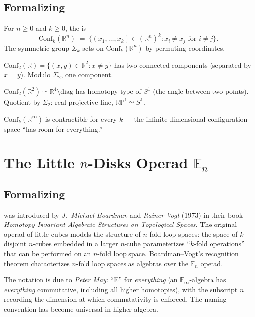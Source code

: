 \subsection{Formalizing}

\begin{definition}
\label{def:configuration}
For $n \geq 0$ and $k \geq 0$, the  is
\begin{equation*}
  \mathrm{Conf}_k(\mathbb{R}^n) \;=\; \bigl\{(x_1, \ldots, x_k) \in (\mathbb{R}^n)^k : x_i \neq x_j \text{ for } i \neq j\bigr\}.
\end{equation*}
The symmetric group $\Sigma_k$ acts on $\mathrm{Conf}_k(\mathbb{R}^n)$ by
permuting coordinates.
\end{definition}

\begin{example_thm}
\label{ex:conf-low}
$\mathrm{Conf}_2(\mathbb{R}) = \{(x, y) \in \mathbb{R}^2 : x \neq y\}$ has
two connected components (separated by $x = y$). Modulo $\Sigma_2$, one
component.

$\mathrm{Conf}_2(\mathbb{R}^2) \simeq \mathbb{R}^4 \setminus \mathrm{diag}$
has homotopy type of $S^1$ (the angle between two points). Quotient by
$\Sigma_2$: real projective line, $\mathbb{RP}^1 \simeq S^1$.

$\mathrm{Conf}_k(\mathbb{R}^\infty)$ is contractible for every $k$ —
the infinite-dimensional configuration space ``has room for everything.''
\end{example_thm}


\section{The Little $n$-Disks Operad $\mathbb{E}_n$}
\label{sec:little-disks}

\subsection{Formalizing}

\begin{nameorigin}
 was introduced by \emph{J.\ Michael Boardman}
and \emph{Rainer Vogt} (1973) in their book \emph{Homotopy Invariant
Algebraic Structures on Topological Spaces}. The original
operad-of-little-cubes models the structure of $n$-fold loop spaces:
the space of $k$ disjoint $n$-cubes embedded in a larger $n$-cube
parameterizes ``$k$-fold operations'' that can be performed on an
$n$-fold loop space. Boardman--Vogt's recognition theorem characterizes
$n$-fold loop spaces as algebras over the $\mathbb{E}_n$ operad.

The notation  is due to \emph{Peter May}: ``E'' for
\emph{everything} (an $\mathbb{E}_\infty$-algebra has \emph{everything}
commutative, including all higher homotopies), with the subscript $n$
recording the dimension at which commutativity is enforced. The naming
convention has become universal in higher algebra.
\end{nameorigin}

